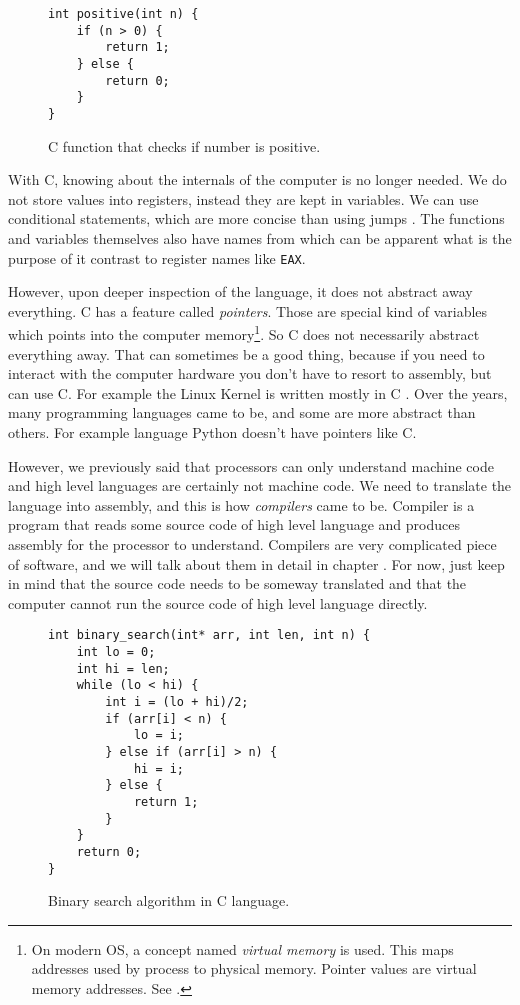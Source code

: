 \begin{figure}\label{fig:c-positive}
\begin{verbatim}
int positive(int n) {
    if (n > 0) {
        return 1;
    } else {
        return 0;
    }
}
\end{verbatim}
\caption{C function that checks if number is positive.}
\end{figure}

With C, knowing about the internals of the computer is no longer needed. We do
not store values into registers, instead they are kept in variables. We can use
conditional statements, which are more concise than using jumps \cite{gotobad}.
The functions and variables themselves also have names from which can be
apparent what is the purpose of it contrast to register names like
\texttt{EAX}.

However, upon deeper inspection of the language, it does not abstract away
everything. C has a feature called \textit{pointers}. Those are special kind of
variables which points into the computer memory\footnote{On modern OS, a
concept named \textit{virtual memory} is used. This maps addresses used by
process to physical memory. Pointer values are virtual memory addresses. See
\cite{modern-os}.}. So C does not necessarily abstract everything away. That
can sometimes be a good thing, because if you need to interact with the
computer hardware you don't have to resort to assembly, but can use C. For
example the Linux Kernel is written mostly in C \cite{linux-source}. Over the
years, many programming languages came to be, and some are more abstract than
others. For example language Python doesn't have pointers like C.

However, we previously said that processors can only understand machine code
and high level languages are certainly not machine code. We need to translate
the language into assembly, and this is how \textit{compilers} came to be.
Compiler is a program that reads some source code of high level language and
produces assembly for the processor to understand. Compilers are very
complicated piece of software, and we will talk about them in detail in chapter
. For now, just keep in mind that the source
code needs to be someway translated and that the computer cannot run the source
code of high level language directly.

\begin{figure}[H]\label{fig:binary-search}
    \begin{verbatim}
int binary_search(int* arr, int len, int n) {
    int lo = 0;
    int hi = len;
    while (lo < hi) {
        int i = (lo + hi)/2;
        if (arr[i] < n) {
            lo = i;
        } else if (arr[i] > n) {
            hi = i;
        } else {
            return 1;
        }
    }
    return 0;
}
    \end{verbatim}
    \caption{Binary search algorithm in C language.}
\end{figure}

